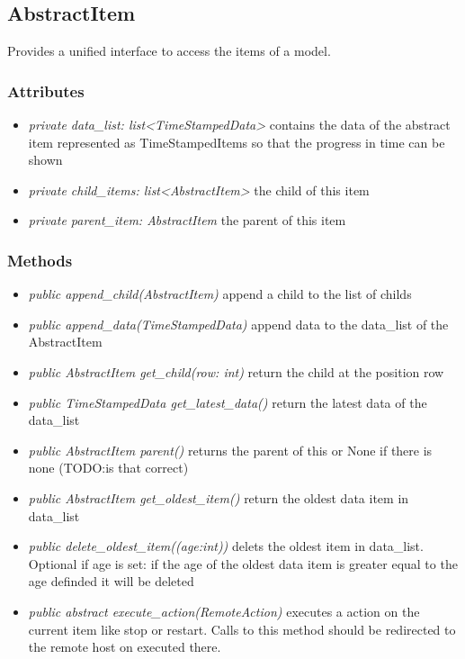 \subsection{AbstractItem}
Provides a unified interface to access the items of a model.
\subsubsection{Attributes}
\begin{itemize}
  \item \textit{private data\_list: list<TimeStampedData>} contains the data of the abstract item represented as TimeStampedItems so that the progress in time can be shown
  \item \textit{private child\_items: list<AbstractItem>} the child of this item
  \item \textit{private parent\_item: AbstractItem} the parent of this item
\end{itemize}
\subsubsection{Methods}
\begin{itemize}
   \item \textit{public append\_child(AbstractItem)} append a child to the list of childs
  \item \textit{public append\_data(TimeStampedData)} append data to the data\_list of the AbstractItem
  \item \textit{public AbstractItem get\_child(row: int)} return the child at the position row
  \item \textit{public TimeStampedData get\_latest\_data()} return the latest data of the data\_list
  \item \textit{public AbstractItem parent()} returns the parent of this or None if there is none (TODO:is that correct)
  \item \textit{public AbstractItem get\_oldest\_item()} return the oldest data item in data\_list
  \item \textit{public delete\_oldest\_item((age:int))} delets the oldest item in data\_list. Optional if age is set: if the age of the oldest data item is greater equal to the age definded it will be deleted
  \item \textit{public abstract execute\_action(RemoteAction)} executes a action on the current item like stop or restart. Calls to this method should be redirected to the remote host on executed there.
\end{itemize}

